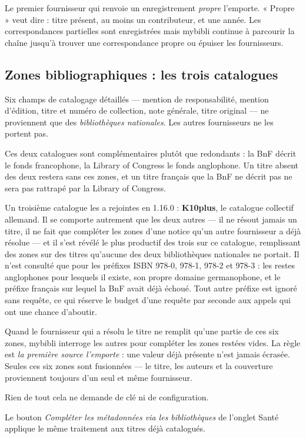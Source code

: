 Le premier fournisseur qui renvoie un enregistrement \emph{propre}
l'emporte. « Propre » veut dire : titre présent, au moins un
contributeur, et une année. Les correspondances partielles sont
enregistrées mais mybibli continue à parcourir la chaîne jusqu'à
trouver une correspondance propre ou épuiser les fournisseurs.

\subsection*{Zones bibliographiques : les trois catalogues}

Six champs de catalogage détaillés — mention de responsabilité,
mention d'édition, titre et numéro de collection, note générale,
titre original — ne proviennent que des \emph{bibliothèques
nationales}. Les autres fournisseurs ne les portent pas.

Ces deux catalogues sont complémentaires plutôt que redondants : la
BnF décrit le fonds francophone, la Library of Congress le fonds
anglophone. Un titre absent des deux restera sans ces zones, et un
titre français que la BnF ne décrit pas ne sera pas rattrapé par la
Library of Congress.

Un troisième catalogue les a rejointes en 1.16.0 :
\textbf{K10plus}, le catalogue collectif allemand. Il se
comporte autrement que les deux autres — il ne résout jamais un titre,
il ne fait que compléter les zones d'une notice qu'un autre fournisseur
a déjà résolue — et il s'est révélé le plus productif des trois sur ce
catalogue, remplissant des zones sur des titres qu'aucune des deux
bibliothèques nationales ne portait. Il n'est consulté que pour les
préfixes ISBN 978-0, 978-1, 978-2 et 978-3 : les restes anglophones pour
lesquels il existe, son propre domaine germanophone, et le préfixe
français sur lequel la BnF avait déjà échoué. Tout autre préfixe est
ignoré sans requête, ce qui réserve le budget d'une requête par seconde
aux appels qui ont une chance d'aboutir.

Quand le fournisseur qui a résolu le titre ne remplit qu'une partie de
ces six zones, mybibli interroge les autres pour compléter les zones
restées vides. La règle est \emph{la première source l'emporte} : une
valeur déjà présente n'est jamais écrasée. Seules ces six zones sont
fusionnées — le titre, les auteurs et la couverture proviennent toujours
d'un seul et même fournisseur.

Rien de tout cela ne demande de clé ni de configuration.

Le bouton \emph{Compléter les métadonnées via les bibliothèques} de
l'onglet Santé applique le même traitement aux titres déjà
catalogués.


